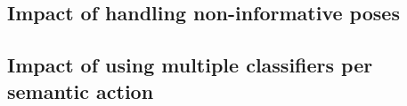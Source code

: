 \subsection{Impact of handling non-informative poses}
\label{subsec:exp_non_info_handling}
%

\subsection{Impact of using multiple classifiers per semantic action}
\label{subsec:exp_multiple}
%


%
%

\begin{comment}
\subsection{CAD120 Dataset}
The CAD120 dataset is introduced in \cite{Koppula2012}. It is composed of 124
videos that contain activities in 10 clases performed by 4 actors. Activities
are related to daily living: \emph{making cereal}, \emph{stacking objects}, or
\emph{taking a meal}. Each activity is composed of simpler actions like
\emph{reaching}, \emph{moving}, or \emph{eating}. In this database, human-object
interactions are an important cue to identify the actions, so object
locations and object affordances are provided as annotations. Performance
evaluation is made through leave-one-subject-out cross-validation. Given
that our method does not consider objects, we use only
the data corresponding to 3D joints of the skeletons. As shown in Table
\ref{Table-CAD120},
our method outperforms the results reported in
\cite{Koppula2012} using the same experimental setup. It is clear that using
only 3D joints is not enough to characterize each action or activity in this
dataset. As part of our future work, we expect that adding information related
to objects will further improve accuracy.
%
\begin{table}
\centering
{\small
\begin{tabular}{|c|c|c|}
\hline
\textbf{Algorithm} & \textbf{Average precision} & \textbf{Average recall}\\
\hline
Our method &  32.6\% & 34.58\% \\
\hline
\cite{Koppula2012} &   27.4\% & 31.2\%\\
\cite{Sung2012} &  23.7\%  &  23.7\% \\
\hline
\end{tabular}
}
\caption{Recognition accuracy of our method compared to state-of-the-art methods
using CAD120 dataset.}
\label{Table-CAD120}
\end{table}
\end{comment}
%



